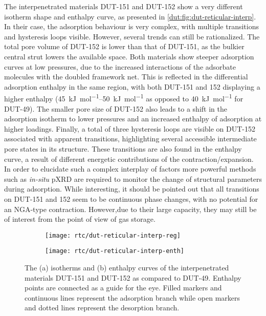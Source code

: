 The interpenetrated materials DUT-151 and DUT-152 show a very different 
isotherm shape and enthalpy curve, as presented in 
\autoref{dut:fig:dut-reticular-interp}. In their case, the adsorption
behaviour is very complex, with multiple transitions and 
hysteresis loops visible. However, several trends can still be rationalized.
The total pore volume of DUT-152 is lower than that of DUT-151, as 
the bulkier central strut lowers the available space. Both materials 
show steeper adsorption curves at low pressures, due to the increased 
interactions of the adsorbate molecules with the doubled framework
net. This is reflected in the differential adsorption enthalpy 
in the same region, with both DUT-151 and 152 displaying a higher
enthalpy (\SIrange{45}{50}{\kilo\joule\per\mol} as opposed to 
\SI{40}{\kilo\joule\per\mol} for DUT-49). The smaller pore size 
of DUT-152 also leads to a shift in the adsorption isotherm to
lower pressures and an increased enthalpy of adsorption at higher 
loadings. Finally, a total of three hysteresis loops are visible 
on DUT-152 associated with apparent transitions, highlighting several
accessible intermediate pore states in its structure. These transitions
are also found in the enthalpy curve, a result of different energetic
contributions of the contraction/expansion. In order to elucidate 
such a complex interplay of factors more powerful methods such
as \textit{in-situ} \gls{pXRD} are required to monitor the change of
structural parameters during adsorption. While interesting,
it should be pointed out that all transitions on DUT-151 and 152 
seem to be continuous phase changes, with no potential for an
\gls{NGA}-type contraction. However,due to their large capacity,
they may still be of interest from the point of view of gas 
storage.

\begin{figure}[htb]
    \centering
    \begin{subfigure}{0.33\linewidth}
        \texttt{[image: rtc/dut-reticular-interp-reg]}%
        \caption{}\label{dut:fig:dut-reticular-interp-reg}
    \end{subfigure}%
    \begin{subfigure}{0.33\linewidth}
        \texttt{[image: rtc/dut-reticular-interp-enth]}%
        \caption{}\label{dut:fig:dut-reticular-interp-enth}
    \end{subfigure}%
    \caption{The (a) isotherms and (b) enthalpy curves of the
    interpenetrated materials DUT-151 and DUT-152 as compared to 
    DUT-49. Enthalpy points are connected as a guide for the eye.
    Filled markers and continuous lines represent the adsorption 
    branch while open markers and dotted lines represent the 
    desorption branch.
    }\label{dut:fig:dut-reticular-interp}
\end{figure}

